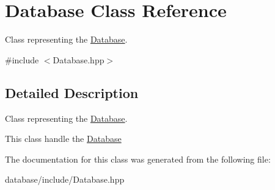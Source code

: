\hypertarget{class_database}{}\section{Database Class Reference}
\label{class_database}


Class representing the \hyperlink{class_database}{Database}.  




{\ttfamily \#include $<$Database.\+hpp$>$}



\subsection{Detailed Description}
Class representing the \hyperlink{class_database}{Database}. 

This class handle the \hyperlink{class_database}{Database} 

The documentation for this class was generated from the following file\+:\begin{DoxyCompactItemize}
\item 
database/include/Database.\+hpp\end{DoxyCompactItemize}
